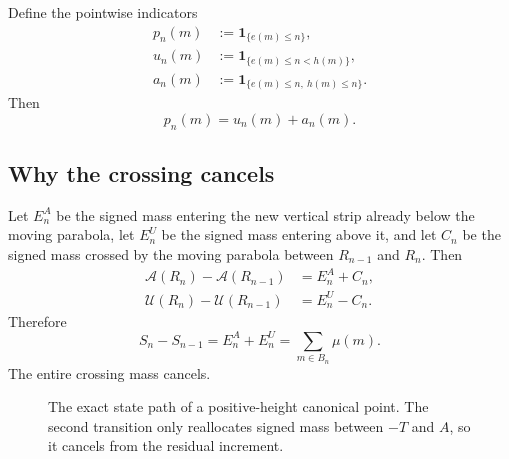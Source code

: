 \documentclass[11pt]{article}
\theoremstyle{definition}
\newcommand{\1}{\mathbf{1}}
\begin{document}
Define the pointwise indicators
\begin{align}
 p_n(m)&:=\1_{\{e(m)\le n\}},
 \label{eq:p-indicator}\\
 u_n(m)&:=\1_{\{e(m)\le n<h(m)\}},
 \label{eq:u-indicator}\\
 a_n(m)&:=\1_{\{e(m)\le n,\ h(m)\le n\}}.
 \label{eq:a-indicator}
\end{align}
Then
\begin{equation}
 \boxed{p_n(m)=u_n(m)+a_n(m).}
 \label{eq:temporal-partition}
\end{equation}

\subsection{Why the crossing cancels}

Let $E_n^A$ be the signed mass entering the new vertical strip already below the moving parabola, let $E_n^U$ be the signed mass entering above it, and let $C_n$ be the signed mass crossed by the moving parabola between $R_{n-1}$ and $R_n$.  Then
\begin{align}
 \mathcal A(R_n)-\mathcal A(R_{n-1})
 &=E_n^A+C_n,
 \label{eq:Delta-A}\\
 \mathcal U(R_n)-\mathcal U(R_{n-1})
 &=E_n^U-C_n.
 \label{eq:Delta-U}
\end{align}
Therefore
\begin{equation}
 \boxed{
 S_n-S_{n-1}
 =E_n^A+E_n^U
 =\sum_{m\in B_n}\mu(m).
 }
 \label{eq:Delta-S}
\end{equation}
The entire crossing mass cancels.

\begin{figure}[htbp]
\centering
{}
\caption{The exact state path of a positive-height canonical point.  The second transition only reallocates signed mass between $-T$ and $A$, so it cancels from the residual increment.}
\label{fig:state-path}
\end{figure}
\end{document}
